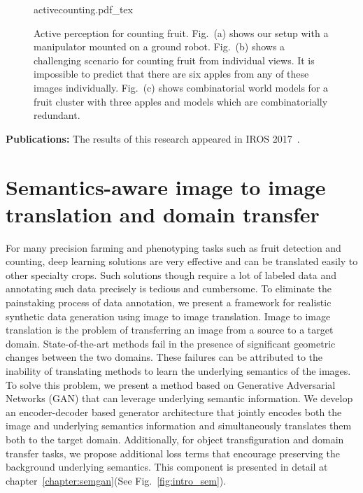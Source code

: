 \begin{figure}[!hbpt]
    \centering
    \def\svgwidth{\textwidth}
    {activecounting.pdf_tex}
    \caption[Active perception for counting fruit.]{ Active perception for counting fruit. Fig.~(a) shows our setup with a manipulator mounted on a ground robot. Fig.~(b) shows a challenging scenario for counting fruit from individual views. It is impossible to predict that there are six apples from any of these images individually. Fig.~(c) shows combinatorial world models for a fruit cluster with three apples and models which are combinatorially redundant. }
    \label{fig:active_counting_intro}
\end{figure}

\textbf{Publications:} The results of this research appeared in IROS 2017~\cite{roy2017active}.

\section{Semantics-aware image to image translation and domain transfer}
For many precision farming and phenotyping tasks such as fruit detection and counting, deep learning solutions are very effective and can be translated easily to other specialty crops. Such solutions though require a lot of labeled data and annotating such data precisely is tedious and cumbersome. To eliminate the painstaking process of data annotation, we present a framework for realistic synthetic data generation using image to image translation.
Image to image translation is the problem of transferring an image from a source to a target domain. State-of-the-art methods fail in the presence of significant geometric changes between the two domains. These failures can be attributed to the inability of translating methods to learn the underlying semantics of the images. To solve this problem, we present a method based on Generative Adversarial Networks (GAN) that can leverage underlying semantic information. We develop an encoder-decoder based generator architecture that jointly encodes both the image and underlying semantics information and simultaneously translates them both to the target domain. Additionally, for object transfiguration and domain transfer tasks, we propose additional loss terms that encourage preserving the background underlying semantics. This component is presented in detail at chapter~\ref{chapter:semgan}(See Fig.~\ref{fig:intro_sem}).\\

